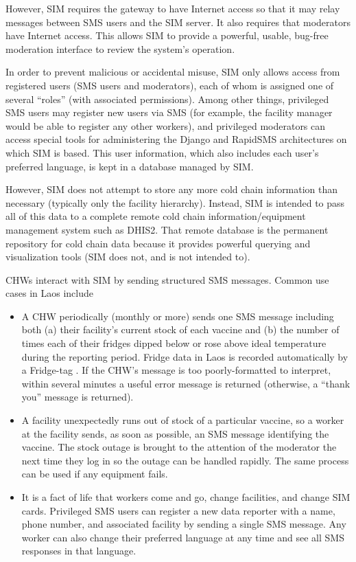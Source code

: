 \documentclass{acm_proc_article-sp}
\begin{document}
However, SIM requires the gateway to have Internet access so that it may relay messages between SMS users and the SIM server. It also requires that moderators have Internet access. This allows SIM to provide a powerful, usable, bug-free moderation interface to review the system's operation.

In order to prevent malicious or accidental misuse, SIM only allows access from registered users (SMS users and moderators), each of whom is assigned one of several ``roles'' (with associated permissions). Among other things, privileged SMS users may register new users via SMS (for example, the facility manager would be able to register any other workers), and privileged moderators can access special tools for administering the Django and RapidSMS architectures on which SIM is based. This user information, which also includes each user's preferred language, is kept in a database managed by SIM.

However, SIM does not attempt to store any more cold chain information than necessary (typically only the facility hierarchy). Instead, SIM is intended to pass all of this data to a complete remote cold chain information/equipment management system such as DHIS2. That remote database is the permanent repository for cold chain data because it provides powerful querying and visualization tools (SIM does not, and is not intended to).

CHWs interact with SIM by sending structured SMS messages. Common use cases in Laos include

\begin{itemize}
\item A CHW periodically (monthly or more) sends one SMS message including both (a) their facility's current stock of each vaccine and (b) the number of times each of their fridges dipped below or rose above ideal temperature during the reporting period. Fridge data in Laos is recorded automatically by a Fridge-tag \textsuperscript{\textregistered} \cite{fridgetag}. If the CHW's message is too poorly-formatted to interpret, within several minutes a useful error message is returned (otherwise, a ``thank you'' message is returned). 
\item A facility unexpectedly runs out of stock of a particular vaccine, so a worker at the facility sends, as soon as possible, an SMS message identifying the vaccine. The stock outage is brought to the attention of the moderator the next time they log in so the outage can be handled rapidly. The same process can be used if any equipment fails.
\item It is a fact of life that workers come and go, change facilities, and change SIM cards. Privileged SMS users can register a new data reporter with a name, phone number, and associated facility by sending a single SMS message. Any worker can also change their preferred language at any time and see all SMS responses in that language.
\end{itemize}
\end{document}
